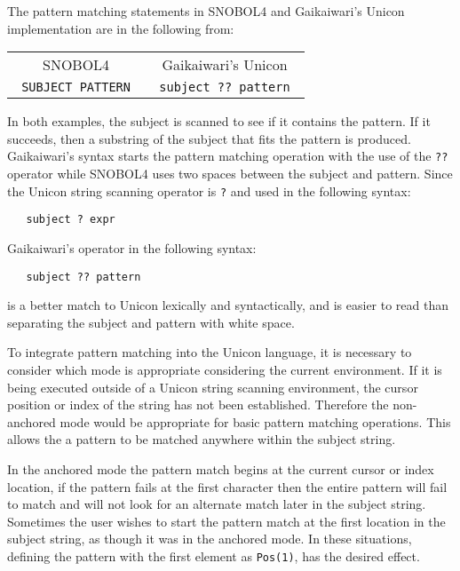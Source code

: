 \documentclass{article}
\begin{document}
The pattern matching statements in SNOBOL4 and Gaikaiwari's Unicon implementation are in the following from:\\

\begin{table}[ht]
	\centering
	\begin{tabular}{c c}
		SNOBOL4 & Gaikaiwari's Unicon \\
		\texttt{ SUBJECT  PATTERN }& 
		
		\texttt{ subject ?? pattern }

	\end{tabular}
\end{table}
\noindent
In both examples, the subject is scanned to see if it contains the pattern.  If it succeeds, then a substring of the subject that fits the pattern is produced.  Gaikaiwari's syntax starts the pattern matching operation with the use of the \texttt{??} operator while SNOBOL4 uses two spaces between the subject and pattern.  Since the Unicon string scanning operator is \texttt{?} and used in the following syntax:
\begin{verbatim}
   subject ? expr
\end{verbatim}
Gaikaiwari's operator in the following syntax:
\begin{verbatim}
   subject ?? pattern
\end{verbatim}
is a better match to Unicon lexically and syntactically, and is easier to read than separating the subject and pattern with white space.   

To integrate pattern matching into the Unicon language, it is necessary to consider which mode is appropriate considering the current environment.  If it is being executed outside of a Unicon string scanning environment, the cursor position or index of the string has not been established.  Therefore the non-anchored mode would be appropriate for basic pattern matching operations.  This allows the a pattern to be matched anywhere within the subject string.  

In the anchored mode the pattern match begins at the current cursor or index location, if the pattern fails at the first character then the entire pattern will fail to match and will not look for an alternate match later in the subject string.  Sometimes the user wishes to start the pattern match at the first location in the subject string, as though it was in the anchored mode.  In these situations, defining the pattern with the first element as \texttt{Pos(1)}, has the desired effect.
\end{document}
